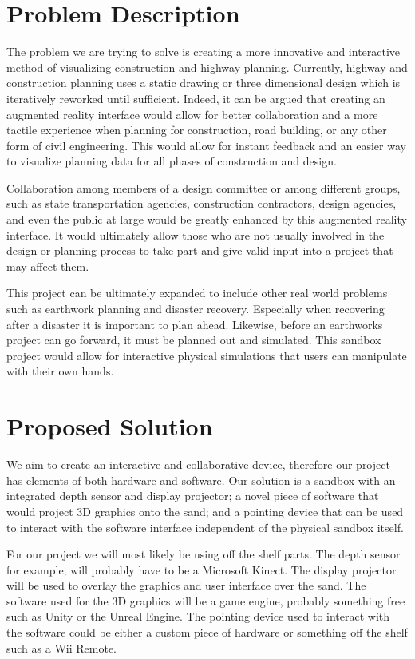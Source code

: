 \documentclass[onecolumn, draftclsnofoot,10pt, compsoc]{IEEEtran}
\begin{document}
\newpage
{}
\tableofcontents
\clearpage

\section{Problem Description}
The problem we are trying to solve is creating a more innovative and interactive method of visualizing construction and highway planning.
Currently, highway and construction planning uses a static drawing or three dimensional design which is iteratively reworked until sufficient.
Indeed, it can be argued that creating an augmented reality interface would allow for better collaboration and a more tactile experience when planning for construction, road building, or any other form of civil engineering.
This would allow for instant feedback and an easier way to visualize planning data for all phases of construction and design.
\par
Collaboration among members of a design committee or among different groups, such as state transportation agencies, construction contractors, design agencies, and even the public at large would be greatly enhanced by this augmented reality interface.
It would ultimately allow those who are not usually involved in the design or planning process to take part and give valid input into a project that may affect them.
\par
This project can be ultimately expanded to include other real world  problems such as earthwork planning and disaster recovery.
Especially when recovering after a disaster it is important to plan ahead. Likewise, before an earthworks project can go forward, it must be planned out and simulated.
This sandbox project would allow for interactive physical simulations that users can manipulate with their own hands.

\section{Proposed Solution}
We aim to create an interactive and collaborative device, therefore our project has elements of both hardware and software.
Our solution is a sandbox with an integrated depth sensor and display projector; a novel piece of software that would project 3D graphics onto the sand; and a pointing device that can be used to interact with the software interface independent of the physical sandbox itself.
\par
For our project we will most likely be using off the shelf parts.
The depth sensor for example, will probably have to be a Microsoft Kinect.
The display projector will be used to overlay the graphics and user interface over the sand.
The software used for the 3D graphics will be a game engine, probably something free such as Unity or the Unreal Engine.
The pointing device used to interact with the software could be either a custom piece of hardware or something off the shelf such as a Wii Remote.
\end{document}
